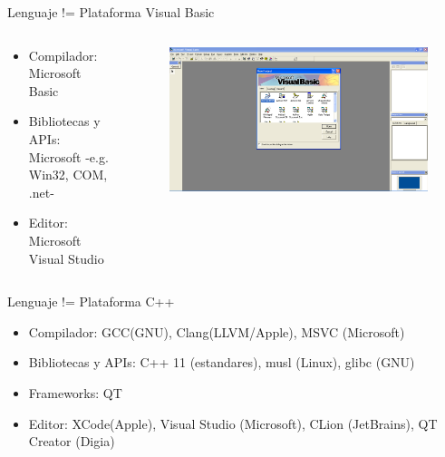 \documentclass[aspectratio=169]{beamer}
\begin{document}
\begin{frame}{Lenguaje != Plataforma}
    Visual Basic


    \begin{columns}[T] %
	     \begin{column}[T]{0.5\textwidth} %
            \begin{itemize}
            	\item Compilador: Microsoft Basic
                \item Bibliotecas y APIs: Microsoft -e.g. Win32, COM, .net-
                \item Editor: Microsoft Visual Studio
            \end{itemize}
	     \end{column}
	     \begin{column}[T]{7cm} %
      			\begin{figure}
      			\centering
      			\includegraphics[width=\linewidth]{Images/basic}
      			\end{figure}

	     \end{column}
     \end{columns}

\end{frame}

\begin{frame}{Lenguaje != Plataforma}
    C++
	\begin{itemize}
	\item Compilador: GCC(GNU), Clang(LLVM/Apple), MSVC (Microsoft)
    \item Bibliotecas y APIs: C++ 11 (estandares), musl (Linux), glibc (GNU)
    \item Frameworks: QT
    \item Editor: XCode(Apple), Visual Studio (Microsoft), CLion (JetBrains), QT Creator (Digia)
	\end{itemize}
\end{frame}
\end{document}

